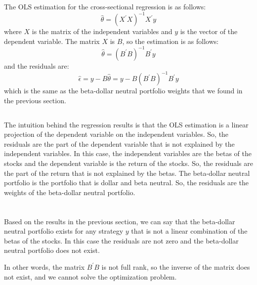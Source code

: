\documentclass[hidelinks,12pt]{article}
\begin{document}
\section{}
\subsection{}
The OLS estimation for the cross-sectional regression is as follows:
\begin{equation*}
\hat{\theta} = (X^{'} X)^{-1} X^{'} y
\end{equation*}
where $X$ is the matrix of the independent variables and $y$ is the vector of the dependent variable. The matrix $X$ is $B$, so the estimation is as follows:
\begin{equation*}
    \hat{\theta} = (B^{'} B)^{-1} B^{'} y
\end{equation*}
and the residuals are:
\begin{equation*}
    \hat{\epsilon} = y - B \hat{\theta} = y - B (B^{'} B)^{-1} B^{'} y
\end{equation*}
which is the same as the beta-dollar neutral portfolio weights that we found in the previous section.
\subsection{}
The intuition behind the regression results is that the OLS estimation is a linear projection of the dependent variable on the independent variables. So, the residuals are the part of the dependent variable that is not explained by the independent variables. In this case, the independent variables are the betas of the stocks and the dependent variable is the return of the stocks. So, the residuals are the part of the return that is not explained by the betas. The beta-dollar neutral portfolio is the portfolio that is dollar and beta neutral. So, the residuals are the weights of the beta-dollar neutral portfolio. 
\section{}
Based on the results in the previous section, we can say that the beta-dollar neutral portfolio exists for any strategy $y$ that is not a linear combination of the betas of the stocks. In this case the residuals are not zero and the beta-dollar neutral portfolio does not exist.

In other words, the matrix $B^{'} B$ is not full rank, so the inverse of the matrix does not exist, and we cannot solve the optimization problem.
\end{document}
